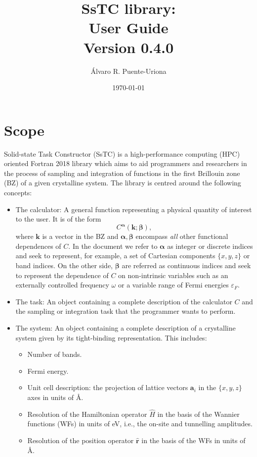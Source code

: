 \documentclass[10pt,a4paper]{article}
\title{SsTC library:\\
\large{User Guide}\\
\large{Version 0.4.0}}
\author{Álvaro R. Puente-Uriona}
\date{\today}
\begin{document}
\maketitle
\tableofcontents
\clearpage
\newpage
\section{Scope}
Solid-state Task Constructor (SsTC) is a high-performance computing (HPC) oriented Fortran 2018 library which aims to aid programmers and researchers in the process of sampling and integration of functions in the first Brillouin zone (BZ) of a given crystalline system. The library is centred around the following concepts:
\begin{tcolorbox}\begin{itemize}
\item The calculator: A general function representing a physical quantity of interest to the user. It is of the form
\begin{equation}\label{eq:calculator}
C^{\bm{\alpha}}(\bm{k}; \bm{\beta}),
\end{equation}
where $\bm{k}$ is a vector in the BZ and $\bm{\alpha}, \bm{\beta}$ encompass \textit{all} other functional dependences of $C$. In the document we refer to $\bm{\alpha}$ as integer or discrete indices and seek to represent, for example, a set of Cartesian components $\{x, y, z\}$ or band indices. On the other side, $\bm{\beta}$ are referred as continuous indices and seek to represent the dependence of $C$ on non-intrinsic variables such as an externally controlled frequency $\omega$ or a variable range of Fermi energies $\varepsilon_F$.
\item The task: An object containing a complete description of the calculator $C$ and the sampling or integration task that the programmer wants to perform.
\item The system: An object containing a complete description of a crystalline system given by its tight-binding \cite{marzariMaximallyLocalizedWannier2012} representation. This includes:
\begin{tcolorbox}\begin{itemize}
\item Number of bands.
\item Fermi energy.
\item Unit cell description: the projection of lattice vectors $\bm{a}_i$ in the $\{x, y, z\}$ axes in units of \r{A}.
\item Resolution of the Hamiltonian operator $\hat{H}$ in the basis of the Wannier functions (WFs) \cite{marzariMaximallyLocalizedWannier2012} in units of eV, i.e., the on-site and tunnelling amplitudes.
\item Resolution of the position operator $\hat{\bm{r}}$ in the basis of the WFs in units of \r{A}.
\end{itemize}\end{tcolorbox}
\end{itemize}
\end{tcolorbox}
\end{document}
